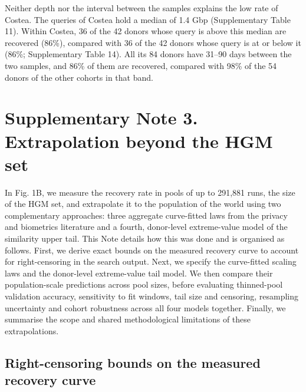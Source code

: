 \documentclass[11pt,a4paper]{article}
\begin{document}
Neither depth nor the interval between the samples explains the low rate of Costea. The queries of Costea hold a median of 1.4 Gbp (Supplementary Table 11). Within Costea, 36 of the 42 donors whose query is above this median are recovered (86\%), compared with 36 of the 42 donors whose query is at or below it (86\%; Supplementary Table 14). All its 84 donors have 31--90 days between the two samples, and 86\% of them are recovered, compared with 98\% of the 54 donors of the other cohorts in that band.
\FloatBarrier
\section*{Supplementary Note 3. Extrapolation beyond the HGM set}

In Fig. 1B, we measure the recovery rate in pools of up to 291,881 runs, the size of the HGM set, and extrapolate it to the population of the world using two complementary approaches: three aggregate curve-fitted laws from the privacy and biometrics literature and a fourth, donor-level extreme-value model of the similarity upper tail. This Note details how this was done and is organised as follows. First, we derive exact bounds on the measured recovery curve to account for right-censoring in the search output. Next, we specify the curve-fitted scaling laws and the donor-level extreme-value tail model. We then compare their population-scale predictions across pool sizes, before evaluating thinned-pool validation accuracy, sensitivity to fit windows, tail size and censoring, resampling uncertainty and cohort robustness across all four models together. Finally, we summarise the scope and shared methodological limitations of these extrapolations.

\subsection*{Right-censoring bounds on the measured recovery curve}
\end{document}

